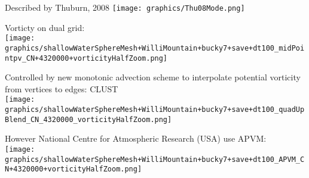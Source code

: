 \begin{slide}

\begin{minipage}{0.49\linewidth}\centering
Described by Thuburn, 2008
\texttt{[image: graphics/Thu08Mode.png]}
\pauseHS
\end{minipage}
\begin{minipage}{0.49\linewidth}
Vorticty on dual grid:\\
\texttt{[image: graphics/shallowWaterSphereMesh+WilliMountain+bucky7+save+dt100\_midPointpv\_CN+4320000+vorticityHalfZoom.png]}
\pauseHS
\end{minipage}
\begin{minipage}{0.49\linewidth}\raggedright\small
Controlled by new monotonic advection scheme to interpolate potential vorticity from vertices to edges: CLUST\\
\texttt{[image: graphics/shallowWaterSphereMesh+WilliMountain+bucky7+save+dt100\_quadUpBlend\_CN\_4320000\_vorticityHalfZoom.png]}
\pauseHS
\end{minipage}
\begin{minipage}{0.49\linewidth}\centering\small
However National Centre for Atmospheric Research (USA) use APVM:\\
\texttt{[image: graphics/shallowWaterSphereMesh+WilliMountain+bucky7+save+dt100\_APVM\_CN+4320000+vorticityHalfZoom.png]}
\end{minipage}

\end{slide}

